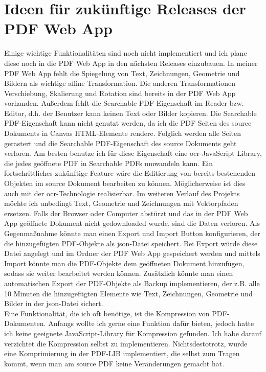 \section{Ideen für zukünftige Releases der PDF Web App}
Einige wichtige Funktionalitäten sind noch nicht implementiert und ich plane diese noch in die PDF Web App in den nächsten Releases einzubauen. In meiner PDF Web App fehlt die Spiegelung von Text, Zeichnungen, Geometrie und Bildern als wichtige affine Transformation. Die anderen Transformationen Verschiebung, Skalierung und Rotation sind bereits in der PDF Web App vorhanden. Außerdem fehlt die Searchable PDF-Eigenschaft im Reader bzw. Editor, d.h. der Benutzer kann keinen Text oder Bilder kopieren. Die Searchable PDF-Eigenschaft kann nicht genutzt werden, da ich die PDF Seiten des source Dokuments in Canvas HTML-Elemente rendere. Folglich werden alle Seiten gerastert und die Searchable PDF-Eigenschaft des source Dokuments geht verloren. Am besten benutze ich für diese Eigenschaft eine \gls{ocr}-JavaScript Library, die jedes geöffnete PDF in Searchable PDFs umwandeln kann. Ein fortschrittliches zukünftige Feature wäre die Editierung von bereits bestehenden Objekten im source Dokument bearbeiten zu können. Möglicherweise ist dies auch mit der \gls{ocr}-Technologie realisierbar. Im weiteren Verlauf des Projekts möchte ich unbedingt Text, Geometrie und Zeichnungen mit Vektorpfaden ersetzen. Falls der Browser oder Computer abstürzt und das in der PDF Web App geöffnete Dokument nicht gedownloaded wurde, sind die Daten verloren. Als Gegenmaßnahme könnte man einen Export und Import Button konfigurieren, der die hinzugefügten PDF-Objekte als \gls{json}-Datei speichert. Bei Export würde diese Datei angelegt und im Ordner der PDF Web App gespeichert werden und mittels Import könnte man die PDF-Objekte dem geöffneten Dokument hinzufügen, sodass sie weiter bearbeitet werden können. Zusätzlich könnte man einen automatischen Export der PDF-Objekte als Backup implementieren, der z.B. alle 10 Minuten die hinzugefügten Elemente wie Text, Zeichnungen, Geometrie und Bilder in der \gls{json}-Datei sichert. \\
Eine Funktionalität, die ich oft benötige, ist die Kompression von PDF-Dokumenten. Anfangs wollte ich gerne eine Funktion dafür bieten, jedoch hatte ich keine geeignete JavaScript-Library für Kompression gefunden. Ich habe darauf verzichtet die Kompression selbst zu implementieren. Nichtsdestotrotz, wurde eine Komprimierung in der PDF-LIB implementiert, die selbst zum Tragen kommt, wenn man am source PDF keine Veränderungen gemacht hat. 